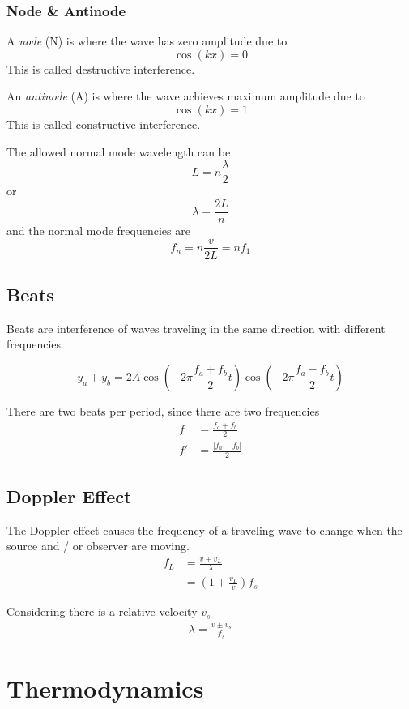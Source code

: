 \documentclass{note}
\begin{document}
\subsection{Node \& Antinode}

A \textit{node} (N) is where the wave has zero amplitude due to
\[
  \cos(kx) = 0
\]
This is called destructive interference.

An \textit{antinode} (A) is where the wave achieves maximum amplitude due to
\[
  \cos(kx) = 1
\]
This is called constructive interference.

The allowed normal mode wavelength can be
\[
  L = n\frac{\lambda}{2}
\]
or
\[
  \lambda = \frac{2L}{n}
\]
and the normal mode frequencies are
\[
  f_n = n\frac{v}{2L} = nf_1
\]


\section{Beats}

Beats are interference of waves traveling in the same direction with different frequencies.

\[
  y_a + y_b = 2A\cos(-2\pi \frac{f_a + f_b}{2}t) \cos(-2\pi \frac{f_a - f_b}{2}t)
\]

There are two beats per period, since there are two frequencies
\begin{align*}
  f  & = \frac{f_a + f_b}{2}   \\
  f' & = \frac{|f_a - f_b|}{2}
\end{align*}

\section{Doppler Effect}

The Doppler effect causes the frequency of a traveling wave to change when the source and / or observer are moving.
\begin{align*}
  f_L
    & = \frac{v + v_L}{\lambda} \\
    & = (1 + \frac{v_L}{v})f_s
\end{align*}

Considering there is a relative velocity \(v_s\)
\begin{align*}
  \lambda = \frac{v \pm v_s}{f_s}
\end{align*}

\chapter{Thermodynamics}
\end{document}
